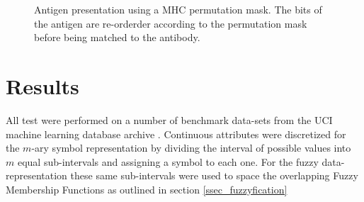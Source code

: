 \documentclass{llncs}
\begin{document}
\begin{figure}[thp]
   \centerline{
              } 
   \caption{Antigen presentation using a MHC permutation mask. The bits of the antigen are re-orderder according to the permutation mask before being matched to the antibody.}
   \label{fig_mhc_permutation}
\end{figure}

\section{Results}
\label{sec_results}
All test were performed on a number of benchmark data-sets from the UCI machine learning database archive \cite{uci}.
Continuous attributes were discretized for the $m$-ary symbol representation by dividing the interval of possible values into $m$ equal sub-intervals and assigning a symbol to each one.
For the fuzzy data-representation these same sub-intervals were used to space the overlapping Fuzzy Membership Functions as outlined in section \ref{ssec_fuzzyfication}

\end{document}
